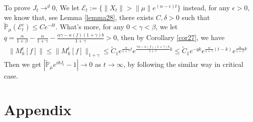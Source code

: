 \documentclass[12pt, a4paper]{amsart}
\theoremstyle{definition}
\numberwithin{equation}{section}
\begin{document}
To prove $J_t\rightarrow^d 0$, We let $\mathcal{E}_t:=\{\|X_t\|>\|\mu\|e^{(\alpha-\epsilon )t}\}$ instead, for any $\epsilon>0$, we know that, see Lemma \ref{lemma28}, there exists
$C,\delta >0$ such that  $\mathbb{\tilde{P}}_{\mu}(\mathcal{E}_t^c)\leq C e^{-\delta t}$. What's more, for any $0< \gamma <\beta$, we let $q=\frac{\alpha}{1+\beta}-\frac{\alpha}{1+\gamma} - \frac{\alpha\gamma-\kappa(f)(1+\gamma)b}{1+\gamma}>0$, then by Corollary \ref{cor27}, we have
\begin{align*}
    \|M_k^t[f]\|\leq \|M_k^t[f]\|_{1+\gamma}\leq \tilde{C}_1 e^{\frac{\alpha}{1+\gamma}t}e^{\frac{\gamma \alpha-\kappa(f)(1+\gamma)b}{1+\gamma}k}\leq \tilde{C}_1 e^{-qk}e^{\frac{\alpha}{1+\gamma}(t-k)}e^{\frac{\alpha}{1+\beta}k}
\end{align*}
Then we get $  \left|\mathbb{\tilde{P}}_{\mu}e^{i\theta J_t}-1\right|\rightarrow 0$ as $ t\rightarrow \infty$, by following the similar way in critical case.

\section{Appendix}
\end{document}
